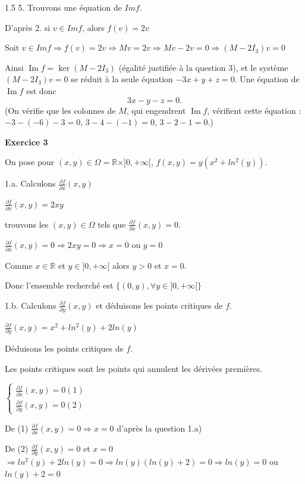 \documentclass[12pt]{article}
\begin{document}
\begin{spacing}{1.5}
5. Trouvons une équation de $Imf$.

D'après 2. si $v\in Imf$, alors $f(v)=2v$

Soit $v\in Imf\Longrightarrow f(v)=2v\Longrightarrow Mv=2v\Longrightarrow Mv-2v=0\Longrightarrow (M-2I_3)v=0$

Ainsi $\operatorname{Im}f=\ker(M-2I_3)$ (égalité justifiée à la question 3), et le système $(M-2I_3)v=0$ se réduit à la seule équation $-3x+y+z=0$. Une équation de $\operatorname{Im}f$ est donc
\[
\boxed{3x-y-z=0}.
\]
(On vérifie que les colonnes de $M$, qui engendrent $\operatorname{Im}f$, vérifient cette équation : $-3-(-6)-3=0$, $3-4-(-1)=0$, $3-2-1=0$.)

\medskip
\textbf{Exercice 3}

On pose pour $(x,y)\in\Omega=\mathbb{R}\times]0,+\infty[$,  $f(x,y)=y(x^2 + ln^2{(y)})$.

1.a. Calculons $\frac{\partial{f}}{\partial{x}}(x,y)$ 

$\frac{\partial{f}}{\partial{x}}(x,y)=2xy$

\medskip
trouvons les $(x,y)\in\Omega$ tels que $\frac{\partial{f}}{\partial{x}}(x,y) = 0$.

$\frac{\partial{f}}{\partial{x}}(x,y) = 0\Rightarrow 2xy=0\Rightarrow x=0$ ou $y=0$

Comme $x\in\mathbb{R}$ et $y\in ]0,+\infty[$ alors $y>0$ et $x=0$.

Donc l'ensemble recherché est $\{(0,y), \forall y\in ]0,+\infty[\}$


1.b. Calculons $\frac{\partial{f}}{\partial{y}}(x,y)$ et déduisons les points critiques de $f$.

$\frac{\partial{f}}{\partial{y}}(x,y)=x^2 + ln^2{(y)}+2ln(y)$

\medskip
Déduisons les points critiques de $f$.

Les points critiques sont les points qui annulent les dérivées premières.

$\begin{cases}
\frac{\partial{f}}{\partial{x}}(x,y) = 0 (1)\\
\frac{\partial{f}}{\partial{y}}(x,y) = 0 (2)
\end{cases}$

De (1) $\frac{\partial{f}}{\partial{x}}(x,y) = 0\Longrightarrow x=0$ d'après la question 1.a)

De (2) $\frac{\partial{f}}{\partial{y}}(x,y) = 0$ et $x=0$ $\Rightarrow ln^2{(y)}+2ln(y)=0\Rightarrow ln(y)(ln(y)+2)=0\Rightarrow ln(y)=0$ ou $ln(y)+2=0$


\end{spacing}
\end{document}
